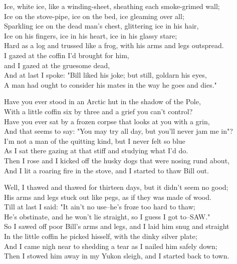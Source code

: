 \begin{poemblock}
Ice, white ice, like a winding-sheet, sheathing each smoke-grimed wall;\\
Ice on the stove-pipe, ice on the bed, ice gleaming over all;\\
Sparkling ice on the dead man's chest, glittering ice in his hair,\\
Ice on his fingers, ice in his heart, ice in his glassy stare;\\
Hard as a log and trussed like a frog, with his arms and legs outspread.\\
I gazed at the coffin I'd brought for him,\\
\idt and I gazed at the gruesome dead,\\
And at last I spoke:  "Bill liked his joke; but still, goldarn his eyes,\\
A man had ought to consider his mates in the way he goes and dies."

Have you ever stood in an Arctic hut in the shadow of the Pole,\\
With a little coffin six by three and a grief you can't control?\\
Have you ever sat by a frozen corpse that looks at you with a grin,\\
And that seems to say:  "You may try all day, but you'll never jam me in"?\\
I'm not a man of the quitting kind, but I never felt so blue\\
As I sat there gazing at that stiff and studying what I'd do.\\
Then I rose and I kicked off the husky dogs that were nosing rund about,\\
And I lit a roaring fire in the stove, and I started to thaw Bill out.

Well, I thawed and thawed for thirteen days, but it didn't seem no good;\\
His arms and legs stuck out like pegs, as if they was made of wood.\\
Till at last I said:  "It ain't no use--he's froze too hard to thaw;\\
He's obstinate, and he won't lie straight, so I guess I got to--SAW."\\
So I sawed off poor Bill's arms and legs, and I laid him snug and straight\\
In the little coffin he picked hisself, with the dinky silver plate;\\
And I came nigh near to shedding a tear as I nailed him safely down;\\
Then I stowed him away in my Yukon sleigh, and I started back to town.


\end{poemblock}
